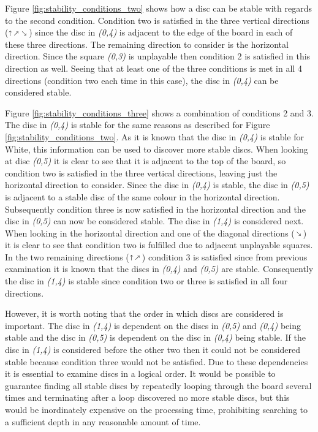\documentclass[12pt,a4paper]{article}
\makeatletter
\newcommand{\fixed@sra}{$\vrule height 2\fontdimen22\textfont2 width 0pt\shortrightarrow$}
\newcommand{\shortarrow}[1]{%
  \mathrel{\text{\rotatebox[origin=c]{\numexpr#1*45}{\fixed@sra}}}
}
\makeatother
\begin{document}
Figure \ref{fig:stability_conditions_two} shows how a disc can be stable with regards to the second condition. Condition two is satisfied in the three vertical directions ($\shortarrow{2} \shortarrow{1} \shortarrow{7}$) since the disc in \textit{(0,4)} is adjacent to the edge of the board in each of these three directions. The remaining direction to consider is the horizontal direction. Since the square \textit{(0,3)} is unplayable then condition 2 is satisfied in this direction as well. Seeing that at least one of the three conditions is met in all 4 directions (condition two each time in this case), the disc in \textit{(0,4)} can be considered stable.

Figure \ref{fig:stability_conditions_three} shows a combination of conditions 2 and 3. The disc in \textit{(0,4)} is stable for the same reasons as described for Figure \ref{fig:stability_conditions_two}. As it is known that the disc in \textit{(0,4)} is stable for White, this information can be used to discover more stable discs. When looking at disc \textit{(0,5)} it is clear to see that it is adjacent to the top of the board, so condition two is satisfied in the three vertical directions, leaving just the horizontal direction to consider. Since the disc in \textit{(0,4)} is stable, the disc in \textit{(0,5)} is adjacent to a stable disc of the same colour in the horizontal direction. Subsequently condition three is now satisfied in the horizontal direction and the disc in \textit{(0,5)} can now be considered stable. The disc in \textit{(1,4)} is considered next. When looking in the horizontal direction and one of the diagonal directions ($\shortarrow{7}$) it is clear to see that condition two is fulfilled due to adjacent unplayable squares. In the two remaining directions ($\shortarrow{2} \shortarrow{1}$) condition 3 is satisfied since from previous examination it is known that the discs in \textit{(0,4)} and \textit{(0,5)} are stable. 
Consequently the disc in \textit{(1,4)} is  stable since condition two or three is satisfied in all four directions.

However, it is worth noting that the order in which discs are considered is important. The disc in \textit{(1,4)} is dependent on the discs in \textit{(0,5)} and \textit{(0,4)} being stable and the disc in \textit{(0,5)} is dependent on the disc in \textit{(0,4)} being stable. If  the disc in \textit{(1,4)} is considered before the other two then it could not be considered stable because condition three would not be satisfied. Due to these dependencies it is essential to examine discs in a logical order. It would be possible to guarantee finding all stable discs by repeatedly looping through the board several times and terminating after a loop discovered no more stable discs, but this would be inordinately expensive on the processing time, prohibiting searching to a sufficient depth in any reasonable amount of time. 
\end{document}
